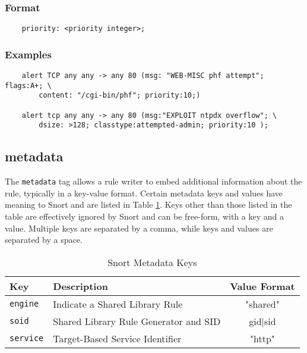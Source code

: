 \documentclass[english]{report}
\begin{document}
\subsubsection{Format}

\begin{verbatim}
    priority: <priority integer>;
\end{verbatim}

\subsubsection{Examples}

\begin{verbatim}
    alert TCP any any -> any 80 (msg: "WEB-MISC phf attempt"; flags:A+; \
        content: "/cgi-bin/phf"; priority:10;)

    alert tcp any any -> any 80 (msg:"EXPLOIT ntpdx overflow"; \ 
        dsize: >128; classtype:attempted-admin; priority:10 );
\end{verbatim}

\subsection{metadata}

The \texttt{metadata} tag allows a rule writer to embed additional information
about the rule, typically in a key-value format.  Certain metadata keys and
values have meaning to Snort and are listed in Table \ref{Snort Metadata Keys}.
Keys other than those listed in the table are effectively ignored by Snort and
can be free-form, with a key and a value.  Multiple keys are separated by a
comma, while keys and values are separated by a space.

\begin{table}[h]
\begin{center}
\caption{Snort Metadata Keys}
\label{Snort Metadata Keys}
\begin{tabular}{|p{1in}|p{2.5in}|c|}

\hline 
Key & Description & Value Format \\
\hline

\hline
\texttt{engine} &
Indicate a Shared Library Rule & "shared" \\

\hline 
\texttt{soid} &
Shared Library Rule Generator and SID & gid$|$sid \\

\hline 
\texttt{service} &
Target-Based Service Identifier & "http" \\

\hline 
\end{tabular}
\end{center}
\end{table}
\end{document}
